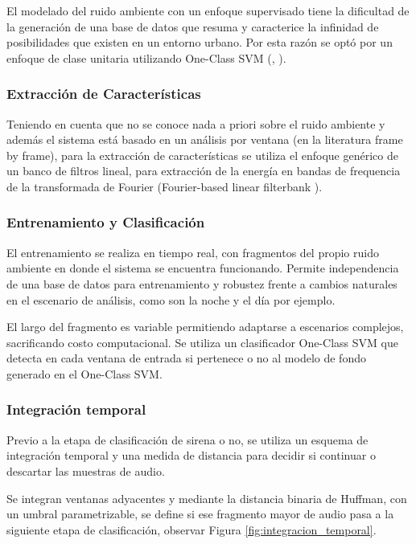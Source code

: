 \documentclass{article}
\begin{document}
El modelado del ruido ambiente con un enfoque supervisado tiene la dificultad de la generación de una base de datos que resuma y caracterice la infinidad de posibilidades que existen en un entorno urbano. Por esta razón se optó por un enfoque de clase unitaria utilizando One-Class SVM (\cite{rabaoui2008one}, \citep{lecomte2011abnormal}).

\subsubsection*{Extracción de Características}
Teniendo en cuenta que no se conoce nada a priori sobre el ruido ambiente y además el sistema está basado en un análisis por ventana (en la literatura frame by frame), para la extracción de características se utiliza el enfoque genérico de un banco de filtros lineal, para extracción de la energía en bandas de frequencia de la transformada de Fourier (Fourier-based linear filterbank \citep{lecomte2011abnormal}).

\subsubsection*{Entrenamiento y Clasificación}
El entrenamiento se realiza en tiempo real, con fragmentos del propio ruido ambiente en donde el sistema se encuentra funcionando. Permite independencia de una base de datos para entrenamiento y robustez frente a cambios naturales en el escenario de análisis, como son la noche y el día por ejemplo. 
\smallskip

El largo del fragmento es variable permitiendo adaptarse a escenarios complejos, sacrificando costo computacional. Se utiliza un clasificador One-Class SVM que detecta en cada ventana de entrada si pertenece o no al modelo de fondo generado en el One-Class SVM.

\subsubsection{Integración temporal}

Previo a la etapa de clasificación de sirena o no, se utiliza un esquema de integración temporal y una medida de distancia para decidir si continuar o descartar las muestras de audio.

\smallskip
Se integran ventanas adyacentes y mediante la distancia binaria de Huffman, con un umbral parametrizable, se define si ese fragmento mayor de audio pasa a la siguiente etapa de clasificación, observar Figura \ref{fig:integracion_temporal}. 
\end{document}
